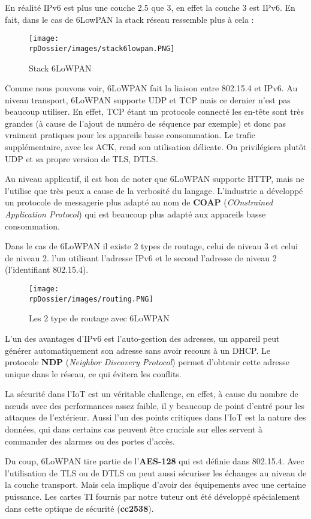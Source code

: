 En réalité IPv6 est plus une couche 2.5 que 3, en effet la couche 3 est IPv6. En fait, dans le cas de 6LowPAN la stack réseau ressemble plus à cela :

\begin{figure}[H]
\centering
\texttt{[image: \\rpDossier/images/stack6lowpan.PNG]}
\caption{Stack 6LoWPAN}
\label{stack6lowpan}
\end{figure}

Comme nous pouvons voir, 6LoWPAN fait la liaison entre 802.15.4 et IPv6. Au niveau transport, 6LoWPAN supporte UDP et TCP mais ce dernier n'est pas beaucoup utiliser. En effet, TCP étant un protocole connecté les en-tête sont très grandes (à cause de l'ajout de numéro de séquence par exemple) et donc pas vraiment pratiques pour les appareils basse consommation. Le trafic supplémentaire, avec les ACK, rend son utilisation délicate. On privilégiera plutôt UDP et sa propre version de TLS, DTLS. 

Au niveau applicatif, il est bon de noter que 6LoWPAN supporte HTTP, mais ne l'utilise que très peux a cause de la verbosité du langage. L'industrie a développé un protocole de messagerie plus adapté au nom de \textbf{COAP} (\textit{COnstrained Application Protocol}) qui est beaucoup plus adapté aux appareils basse consommation.



Dans le cas de 6LoWPAN il existe 2 types de routage, celui de niveau 3 et celui de niveau 2. l'un utilisant l'adresse IPv6 et le second l'adresse de niveau 2 (l'identifiant 802.15.4).

\begin{figure}[H]
\centering
\texttt{[image: \\rpDossier/images/routing.PNG]}
\caption{Les 2 type de routage avec 6LoWPAN}
\label{routing}
\end{figure}

L'un des avantages d'IPv6 est l'auto-gestion des adresses, un appareil peut générer automatiquement son adresse sans avoir recours à un DHCP. Le protocole \textbf{NDP} (\textit{Neighbor Discovery Protocol}) permet d'obtenir cette adresse unique dans le réseau, ce qui évitera les conflits.

La sécurité dans l'IoT est un véritable challenge, en effet, à cause du nombre de nœuds avec des performances assez faible, il y beaucoup de point d'entré pour les attaques de l'extérieur. Aussi l'un des points critiques dans l'IoT est la nature des données, qui dans certains cas peuvent être cruciale sur elles servent à commander des alarmes ou des portes d'accès.

Du coup, 6LoWPAN tire partie de l'\textbf{AES-128} qui est définie dans 802.15.4. Avec l'utilisation de TLS ou de DTLS on peut aussi sécuriser les échanges au niveau de la couche transport. Mais cela implique d'avoir des équipements avec une certaine puissance. Les cartes TI fournis par notre tuteur ont été développé spécialement dans cette optique de sécurité (\textbf{cc2538}).
